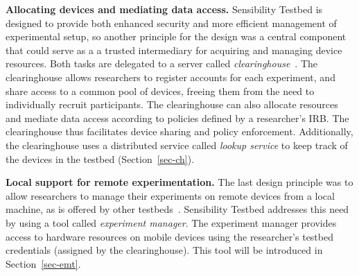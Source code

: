 \textbf{Allocating devices and mediating data access.}
Sensibility Testbed is designed to provide both enhanced security and 
more efficient management of experimental setup, so another principle 
for the design was a central component that could serve as a a trusted 
intermediary for acquiring and managing device resources. Both tasks 
are delegated to  a server called \textit{clearinghouse}~\cite{ch}. The 
clearinghouse allows researchers to 
register accounts for each experiment, and share access to a common 
pool of devices, freeing them from the need to individually recruit participants. 
The clearinghouse can also allocate resources and mediate 
data access according to policies defined by a researcher's IRB. The 
clearinghouse thus facilitates device sharing and policy enforcement.  
Additionally, the clearinghouse uses a distributed service called 
\textit{lookup service} to keep track of the devices in the testbed 
(Section~\ref{sec-ch}).

\textbf{Local support for remote experimentation.} 
The last design principle was to allow researchers to manage their 
experiments on remote devices from a local machine, as is offered 
by other testbeds~\cite{hibler2008large, peterson2006experiences}. Sensibility 
Testbed addresses this need by using a tool called \textit{experiment 
manager}. The experiment manager provides access to 
hardware resources on mobile devices using the researcher's testbed 
credentials (assigned by the clearinghouse). This tool will be introduced
in Section~\ref{sec-emt}.



